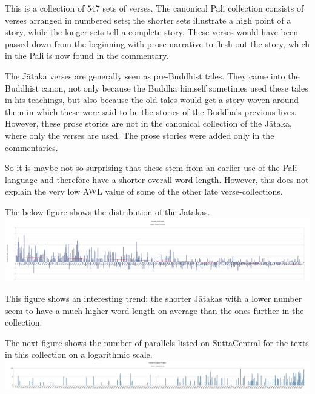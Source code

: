 This is a collection of 547 sets of verses. The canonical Pali collection consists of verses arranged in numbered sets; the shorter sets illustrate a high point of a story, while the longer sets tell a complete story. These verses would have been passed down from the beginning with prose narrative to flesh out the story, which in the Pali is now found in the commentary. 

The Jātaka verses are generally seen as pre-Buddhist tales. They came into the Buddhist canon, not only because the Buddha himself sometimes used these tales in his teachings, but also because the old tales would get a story woven around them in which these were said to be the stories of the Buddha's previous lives. However, these prose stories are not in the canonical collection of the Jātaka, where only the verses are used. The prose stories were added only in the commentaries. 

So it is maybe not so surprising that these stem from an earlier use of the Pali language and therefore have a shorter overall word-length. However, this does not explain the very low AWL value of some of the other late verse-collections.

The below figure shows the distribution of the Jātakas.\\

\includegraphics[width=\linewidth]{jataka.jpg}
\label{jataka}

\medskip
This figure shows an interesting trend: the shorter Jātakas with a lower number seem to have a much higher word-length on average than the ones further in the collection. 

The next figure shows the number of parallels listed on SuttaCentral for the texts in this collection on a logarithmic scale. \\

\includegraphics[width=\linewidth]{jatakapars.jpg}
\label{jatakapars}

